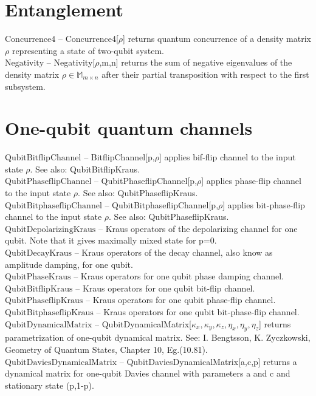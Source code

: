 \documentclass[a4paper,10pt]{scrartcl}
\begin{document}
\section{Entanglement}

\noindent\textbf{$ \text{Concurrence4} $ }-- Concurrence4[$\rho $] returns quantum concurrence of a density matrix $\rho $ representing a state of two-qubit system.$  $\\[8pt]
\noindent\textbf{$ \text{Negativity} $ }-- Negativity[$\rho $,m,n] returns the sum of negative eigenvalues of the density matrix $\rho \in $$ \mathbb{M}_{m\times n} $ after their partial transposition with respect to the first subsystem.$  $\\[8pt]
\section{One-qubit quantum channels}

\noindent\textbf{$ \text{QubitBitflipChannel} $ }-- BitflipChannel[p,$\rho $] applies bif-flip channel to the input state $\rho $. See also: QubitBitflipKraus.$  $\\[8pt]
\noindent\textbf{$ \text{QubitPhaseflipChannel} $ }-- QubitPhaseflipChannel[p,$\rho $] applies phase-flip channel to the input state $\rho $. See also: QubitPhaseflipKraus.$  $\\[8pt]
\noindent\textbf{$ \text{QubitBitphaseflipChannel} $ }-- QubitBitphaseflipChannel[p,$\rho $] applies bit-phase-flip channel to the input state $\rho $. See also: QubitPhaseflipKraus.$  $\\[8pt]
\noindent\textbf{$ \text{QubitDepolarizingKraus} $ }-- Kraus operators of the depolarizing channel for one qubit. Note that it gives maximally mixed state for p=0.$  $\\[8pt]
\noindent\textbf{$ \text{QubitDecayKraus} $ }-- Kraus operators of the decay channel, also know as amplitude damping, for one qubit.$  $\\[8pt]
\noindent\textbf{$ \text{QubitPhaseKraus} $ }-- Kraus operators for one qubit phase damping channel.$  $\\[8pt]
\noindent\textbf{$ \text{QubitBitflipKraus} $ }-- Kraus operators for one qubit bit-flip channel.$  $\\[8pt]
\noindent\textbf{$ \text{QubitPhaseflipKraus} $ }-- Kraus operators for one qubit phase-flip channel.$  $\\[8pt]
\noindent\textbf{$ \text{QubitBitphaseflipKraus} $ }-- Kraus operators for one qubit bit-phase-flip channel.$  $\\[8pt]
\noindent\textbf{$ \text{QubitDynamicalMatrix} $ }-- QubitDynamicalMatrix[$ \kappa _x,\kappa _y,\kappa _z,\eta _x,\eta _y,\eta _z $] returns parametrization of one-qubit dynamical matrix. See: I. Bengtsson, K. Zyczkowski, Geometry of Quantum States, Chapter 10, Eg.(10.81).$  $\\[8pt]
\noindent\textbf{$ \text{QubitDaviesDynamicalMatrix} $ }-- QubitDaviesDynamicalMatrix[a,c,p] returns a dynamical matrix for one-qubit Davies channel with parameters a and c and stationary state (p,1-p).$  $\\[8pt]
\end{document}

